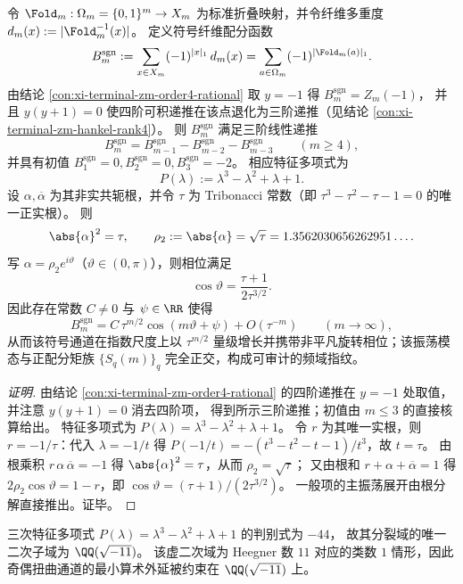 \begin{conclusion}\label{con:xi-terminal-signed-fiber-partition-recurrence}
令 \(\Fold_m:\Omega_m=\{0,1\}^m\to X_m\) 为标准折叠映射，并令纤维多重度 \(d_m(x):=|\Fold_m^{-1}(x)|\)。
定义符号纤维配分函数
\[
B_m^{\mathrm{sgn}}:=\sum_{x\in X_m}(-1)^{|x|_1}\,d_m(x)
=\sum_{a\in\Omega_m}(-1)^{|\Fold_m(a)|_1}.
\]
由结论 \ref{con:xi-terminal-zm-order4-rational} 取 \(y=-1\) 得 \(B_m^{\mathrm{sgn}}=Z_m(-1)\)，
并且 \(y(y+1)=0\) 使四阶可积递推在该点退化为三阶递推（见结论 \ref{con:xi-terminal-zm-hankel-rank4}）。
则 \(B_m^{\mathrm{sgn}}\) 满足三阶线性递推
\[
B_m^{\mathrm{sgn}}=B_{m-1}^{\mathrm{sgn}}-B_{m-2}^{\mathrm{sgn}}-B_{m-3}^{\mathrm{sgn}}\qquad(m\ge 4),
\]
并具有初值 \(B_1^{\mathrm{sgn}}=0,B_2^{\mathrm{sgn}}=0,B_3^{\mathrm{sgn}}=-2\)。
相应特征多项式为
\[
P(\lambda):=\lambda^3-\lambda^2+\lambda+1.
\]
设 \(\alpha,\overline{\alpha}\) 为其非实共轭根，并令 \(\tau\) 为 Tribonacci 常数（即 \(\tau^3-\tau^2-\tau-1=0\) 的唯一正实根）。
则
\[
\abs{\alpha}^2=\tau,
\qquad
\rho_2:=\abs{\alpha}=\sqrt{\tau}=1.3562030656262951\ldots .
\]
写 \(\alpha=\rho_2 e^{i\vartheta}\)（\(\vartheta\in(0,\pi)\)），则相位满足
\[
\cos\vartheta=\frac{\tau+1}{2\tau^{3/2}}.
\]
因此存在常数 \(C\neq 0\) 与 \(\psi\in\RR\) 使得
\[
B_m^{\mathrm{sgn}}=C\,\tau^{m/2}\cos(m\vartheta+\psi)+O(\tau^{-m})\qquad(m\to\infty),
\]
从而该符号通道在指数尺度上以 \(\tau^{m/2}\) 量级增长并携带非平凡旋转相位；该振荡模态与正配分矩族 \(\{S_q(m)\}_q\) 完全正交，构成可审计的频域指纹。
\end{conclusion}
\begin{proof}[证明]
由结论 \ref{con:xi-terminal-zm-order4-rational} 的四阶递推在 \(y=-1\) 处取值，并注意 \(y(y+1)=0\) 消去四阶项，
得到所示三阶递推；初值由 \(m\le 3\) 的直接核算给出。
特征多项式为 \(P(\lambda)=\lambda^3-\lambda^2+\lambda+1\)。
令 \(r\) 为其唯一实根，则 \(r=-1/\tau\)：代入 \(\lambda=-1/t\) 得 \(P(-1/t)=-(t^3-t^2-t-1)/t^3\)，故 \(t=\tau\)。
由根乘积 \(r\,\alpha\,\overline{\alpha}=-1\) 得 \(\abs{\alpha}^2=\tau\)，从而 \(\rho_2=\sqrt{\tau}\)；
又由根和 \(r+\alpha+\overline{\alpha}=1\) 得 \(2\rho_2\cos\vartheta=1-r\)，即 \(\cos\vartheta=(\tau+1)/(2\tau^{3/2})\)。
一般项的主振荡展开由根分解直接推出。证毕。
\end{proof}

\begin{remark}[判别式与二次分辨率子域]\label{rem:xi-terminal-signed-fiber-partition-discriminant}
三次特征多项式 \(P(\lambda)=\lambda^3-\lambda^2+\lambda+1\) 的判别式为 \(-44\)，
故其分裂域的唯一二次子域为 \(\QQ(\sqrt{-11})\)。
该虚二次域为 Heegner 数 \(11\) 对应的类数 \(1\) 情形，因此奇偶扭曲通道的最小算术外延被约束在 \(\QQ(\sqrt{-11})\) 上。
\end{remark}

